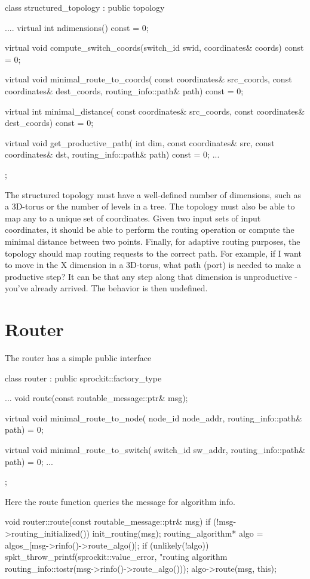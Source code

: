 \begin{CppCode}
class structured_topology :
  public topology
{
  ....
  virtual int
  ndimensions() const = 0;	

  virtual void
  compute_switch_coords(switch_id swid, coordinates& coords) const = 0;

  virtual void
  minimal_route_to_coords(
    const coordinates& src_coords,
    const coordinates& dest_coords,
    routing_info::path& path) const = 0;

  virtual int
  minimal_distance(
    const coordinates& src_coords,
    const coordinates& dest_coords) const = 0;

  virtual void
  get_productive_path(
    int dim,
    const coordinates& src,
    const coordinates& dst,
    routing_info::path& path) const = 0;
  ...
};
\end{CppCode}
The structured topology must have a well-defined number of dimensions, such as a 3D-torus or the number of levels in a tree.
The topology must also be able to map any \switchid to a unique set of coordinates.
Given two input sets of input coordinates, it should be able to perform the routing operation or compute the minimal distance between two points.
Finally, for adaptive routing purposes, the topology should map routing requests to the correct path.
For example, if I want to move in the X dimension in a 3D-torus, what path (port) is needed to make a productive step?
It can be that any step along that dimension is unproductive - you've already arrived.
The behavior is then undefined.

\section{Router}\label{sec:router}
The router has a simple public interface

\begin{CppCode}
class router :
  public sprockit::factory_type
{
...
  void
  route(const routable_message::ptr& msg);

  virtual void
  minimal_route_to_node(
    node_id node_addr,
    routing_info::path& path) = 0;
    
  virtual void
  minimal_route_to_switch(
    switch_id sw_addr,
    routing_info::path& path) = 0;
...
};
\end{CppCode}

Here the route function queries the message for algorithm info.

\begin{CppCode}
void
router::route(const routable_message::ptr& msg)
{
  if (!msg->routing_initialized()) {
    init_routing(msg);
  }
  routing_algorithm* algo = algos_[msg->rinfo()->route_algo()];
  if (unlikely(!algo)) {
    spkt_throw_printf(sprockit::value_error,
                     "routing algorithm %
                     routing_info::tostr(msg->rinfo()->route_algo()));
  }
  algo->route(msg, this);
}
\end{CppCode}

